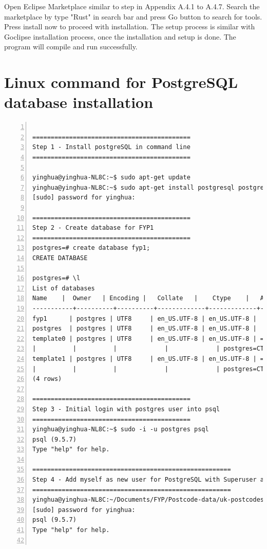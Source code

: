 Open Eclipse Marketplace similar to step in Appendix A.4.1 to A.4.7. Search the marketplace by type "Rust" in search bar and press Go button to search for tools. Press install now to proceed with installation. The setup process is similar with Goclipse installation process, once the installation and setup is done. The program will compile and run successfully.

\pagebreak  

\section{Linux command for PostgreSQL database installation}

\lstset{basicstyle=\ttfamily\tiny} 
\begin{lstlisting}[breaklines, frame=single, numbers=left, caption={Linux command for PostgreSQL database installation}, label=commandline-02]

===========================================
Step 1 - Install postgreSQL in command line 
===========================================

yinghua@yinghua-NL8C:~$ sudo apt-get update
yinghua@yinghua-NL8C:~$ sudo apt-get install postgresql postgresql-contrib
[sudo] password for yinghua: 

===========================================
Step 2 - Create database for FYP1 
===========================================
postgres=# create database fyp1;
CREATE DATABASE

postgres=# \l
List of databases
Name    |  Owner   | Encoding |   Collate   |    Ctype    |   Access privileges   
-----------+----------+----------+-------------+-------------+-----------------------
fyp1      | postgres | UTF8     | en_US.UTF-8 | en_US.UTF-8 | 
postgres  | postgres | UTF8     | en_US.UTF-8 | en_US.UTF-8 | 
template0 | postgres | UTF8     | en_US.UTF-8 | en_US.UTF-8 | =c/postgres          +
|          |          |             |             | postgres=CTc/postgres
template1 | postgres | UTF8     | en_US.UTF-8 | en_US.UTF-8 | =c/postgres          +
|          |          |             |             | postgres=CTc/postgres
(4 rows)

===========================================
Step 3 - Initial login with postgres user into psql
===========================================
yinghua@yinghua-NL8C:~$ sudo -i -u postgres psql 
psql (9.5.7)
Type "help" for help.

======================================================
Step 4 - Add myself as new user for PostgreSQL with Superuser access
======================================================
yinghua@yinghua-NL8C:~/Documents/FYP/Postcode-data/uk-postcodes-master$ sudo -i -u postgres psql fyp1
[sudo] password for yinghua: 
psql (9.5.7)
Type "help" for help.


\end{lstlisting}
